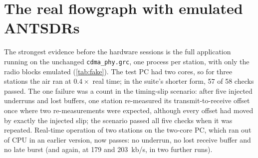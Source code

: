 \documentclass[11pt,a4paper,oneside]{report}
\newcommand{\code}[1]{\texttt{\small #1}}
\begin{document}
\section{The real flowgraph with emulated ANTSDRs}\label{sec:fakeres}
The strongest evidence before the hardware sessions is the full application running on the unchanged
\code{cdma\_phy.grc}, one process per station, with only the radio blocks emulated (\cref{tab:fake}). The
test PC had two cores, so for three stations the air ran at $0.4\times$ real time; in the suite's shorter
form, 57 of 58 checks passed. The one failure was a count in the timing-slip scenario: after five injected underruns and
lost buffers, one station re-measured its transmit-to-receive offset once where two re-measurements
were expected, although every offset had moved by exactly the injected slip; the scenario passed all
five checks when it was repeated. Real-time operation of two stations on the two-core PC, which ran
out of CPU in an earlier version, now passes: no underrun, no lost receive buffer and no late burst
(and again, at 179 and \SI{203}{kb/s}, in two further runs).
\end{document}
